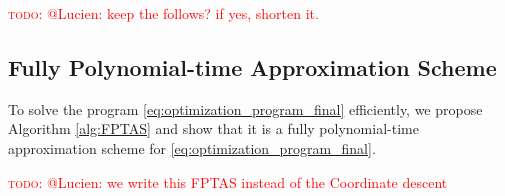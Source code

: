 \documentclass[letterpaper]{article} %
\newcommand{\probdistri}{\mathbf{p}}
\newcommand{\complexbound}{\beta}
\newcommand{\red}[1]{\textcolor{red}{#1}}
\newcommand{\todo}[1]{\red{\textsc{todo:} #1}}
\newcommand{\citet}[1]{\citeauthor{#1}\ (\citeyear{#1})}
\begin{document}
\todo{@Lucien: keep the follows? if yes, shorten it.}

\subsection{Fully Polynomial-time Approximation Scheme} %
\label{sub:ptas}

To solve the program \eqref{eq:optimization_program_final} efficiently, we propose Algorithm \ref{alg:FPTAS} and show that it is a fully polynomial-time approximation scheme for \eqref{eq:optimization_program_final}. 

\todo{@Lucien: we write this FPTAS instead of the Coordinate descent}
\end{document}
